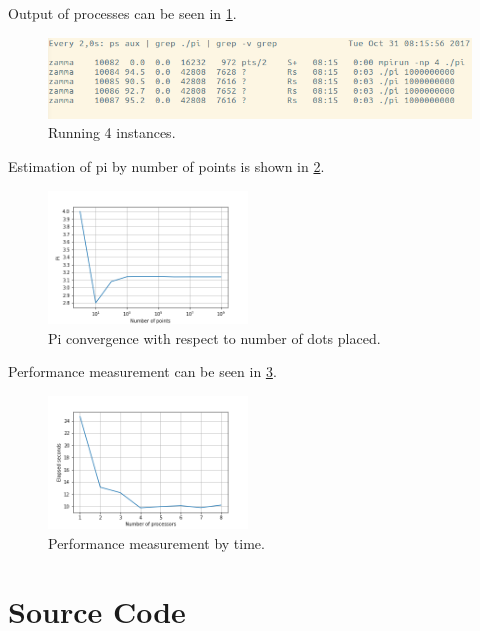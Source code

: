 \documentclass[12pt,a4paper]{article}
\begin{document}
    Output of processes can be seen in \figurename{} \ref{ps}.
    \begin{figure}[!h]
        \begin{center}
            \includegraphics[width=\linewidth]{resimler/ps.png}
            \caption{Running 4 instances.}
            \label{ps}
        \end{center}
    \end{figure}

    Estimation of pi by number of points is shown in \figurename{} \ref{pnt}.
    \begin{figure}[!h]
        \begin{center}
            \includegraphics[width=200px]{resimler/point.png}
            \caption{Pi convergence with respect to number of dots placed.}
            \label{pnt}
        \end{center}
    \end{figure}

    Performance measurement can be seen in \figurename{} \ref{perf}.
    \begin{figure}[!h]
        \begin{center}
            \includegraphics[width=200px]{resimler/proc.png}
            \caption{Performance measurement by time.}
            \label{perf}
        \end{center}
    \end{figure}

    \newpage
    \appendix
    \section{Source Code}
    
\end{document}
